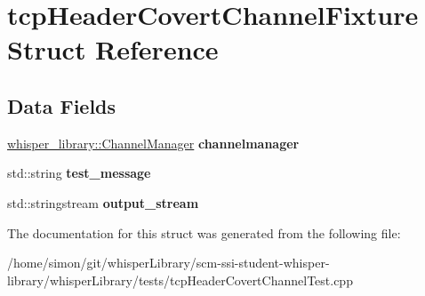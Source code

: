 \hypertarget{structtcpHeaderCovertChannelFixture}{\section{tcp\-Header\-Covert\-Channel\-Fixture \-Struct \-Reference}
\label{structtcpHeaderCovertChannelFixture}
}
\subsection*{\-Data \-Fields}
\begin{DoxyCompactItemize}
\item 
\hypertarget{structtcpHeaderCovertChannelFixture_a3f6da79e79f31daed75dd087b571260c}{\hyperlink{classwhisper__library_1_1ChannelManager}{whisper\-\_\-library\-::\-Channel\-Manager} {\bfseries channelmanager}}\label{structtcpHeaderCovertChannelFixture_a3f6da79e79f31daed75dd087b571260c}

\item 
\hypertarget{structtcpHeaderCovertChannelFixture_a03362f551dd6e876e5cc9fd1e7f1e6f4}{std\-::string {\bfseries test\-\_\-message}}\label{structtcpHeaderCovertChannelFixture_a03362f551dd6e876e5cc9fd1e7f1e6f4}

\item 
\hypertarget{structtcpHeaderCovertChannelFixture_a152fa621f6422a7f614c02f1bf6e11c5}{std\-::stringstream {\bfseries output\-\_\-stream}}\label{structtcpHeaderCovertChannelFixture_a152fa621f6422a7f614c02f1bf6e11c5}

\end{DoxyCompactItemize}


\-The documentation for this struct was generated from the following file\-:\begin{DoxyCompactItemize}
\item 
/home/simon/git/whisper\-Library/scm-\/ssi-\/student-\/whisper-\/library/whisper\-Library/tests/tcp\-Header\-Covert\-Channel\-Test.\-cpp\end{DoxyCompactItemize}
